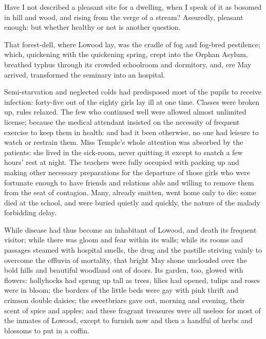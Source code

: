 Have I not described a pleasant site for a dwelling, when I speak of it
as bosomed in hill and wood, and rising from the verge of a stream? 
Assuredly, pleasant enough: but whether healthy or not is another
question.

That forest-dell, where Lowood lay, was the cradle of fog and fog-bred
pestilence; which, quickening with the quickening spring, crept into the
Orphan Asylum, breathed typhus through its crowded schoolroom and
dormitory, and, ere May arrived, transformed the seminary into an
hospital.

Semi-starvation and neglected colds had predisposed most of the pupils
to receive infection: forty-five out of the eighty girls lay ill at one
time. Classes were broken up, rules relaxed. The few who continued
well were allowed almost unlimited license; because the medical
attendant insisted on the necessity of frequent exercise to keep them in
health: and had it been otherwise, no one had leisure to watch or
restrain them. Miss Temple's whole attention was absorbed by the
patients: she lived in the sick-room, never quitting it except to snatch
a few hours' rest at night. The teachers were fully occupied with
packing up and making other necessary preparations for the departure of
those girls who were fortunate enough to have friends and relations able
and willing to remove them from the seat of contagion. Many, already
smitten, went home only to die: some died at the school, and were buried
quietly and quickly, the nature of the malady forbidding delay.

While disease had thus become an inhabitant of Lowood, and death its
frequent visitor; while there was gloom and fear within its walls; while
its rooms and passages steamed with hospital smells, the drug and the
pastille striving vainly to overcome the effluvia of mortality, that
bright May shone unclouded over the bold hills and beautiful woodland
out of doors. Its garden, too, glowed with flowers: hollyhocks had
sprung up tall as trees, lilies had opened, tulips and roses were in
bloom; the borders of the little beds were gay with pink thrift and
crimson double daisies; the sweetbriars gave out, morning and evening,
their scent of spice and apples; and these fragrant treasures were all
useless for most of the inmates of Lowood, except to furnish now and
then a handful of herbs and blossoms to put in a coffin.

